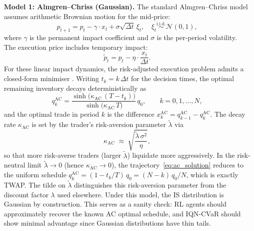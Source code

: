 \documentclass[11pt]{article}
\begin{document}
\textbf{Model 1: Almgren--Chriss (Gaussian).}  The standard Almgren--Chriss model \citet{almgren2001optimal} assumes arithmetic Brownian motion for the mid-price:
\begin{equation}\label{eq:ac_price}
    p_{t+1} = p_t - \gamma \cdot x_t + \sigma \sqrt{\Delta t}\, \xi_t, \quad \xi_t \overset{\text{i.i.d.}}{\sim} \mathcal{N}(0, 1),
\end{equation}
where $\gamma$ is the permanent impact coefficient and $\sigma$ is the per-period volatility.  The execution price includes temporary impact:
\begin{equation}\label{eq:ac_exec}
    \tilde{p}_t = p_t - \eta \cdot \frac{x_t}{\Delta t}.
\end{equation}
For these linear impact dynamics, the risk-adjusted execution problem admits a closed-form minimiser \citet{almgren2001optimal}. Writing $t_k = k\,\Delta t$ for the decision times, the optimal remaining inventory decays deterministically as
\begin{equation}\label{eq:ac_solution}
    q_k^{\mathrm{AC}} = \frac{\sinh\!\big(\kappa_{\mathrm{AC}}\,(T - t_k)\big)}{\sinh\!\big(\kappa_{\mathrm{AC}}\, T\big)}\, q_0, \qquad k = 0, 1, \ldots, N,
\end{equation}
and the optimal trade in period $k$ is the difference $x_k^{\mathrm{AC}} = q_{k-1}^{\mathrm{AC}} - q_k^{\mathrm{AC}}$. The decay rate $\kappa_{\mathrm{AC}}$ is set by the trader's risk-aversion parameter $\tilde{\lambda}$ via
\begin{equation}\label{eq:ac_kappa}
    \kappa_{\mathrm{AC}} \;\approx\; \sqrt{\frac{\tilde{\lambda}\,\sigma^2}{\eta}},
\end{equation}
so that more risk-averse traders (larger $\tilde{\lambda}$) liquidate more aggressively. In the risk-neutral limit $\tilde{\lambda} \to 0$ (hence $\kappa_{\mathrm{AC}} \to 0$), the trajectory~\eqref{eq:ac_solution} reduces to the uniform schedule $q_k^{\mathrm{AC}} = (1 - t_k/T)\,q_0 = (N-k)\,q_0/N$, which is exactly TWAP. The tilde on $\tilde{\lambda}$ distinguishes this risk-aversion parameter from the discount factor $\lambda$ used elsewhere.
Under this model, the IS distribution is Gaussian by construction.  This serves as a sanity check: RL agents should approximately recover the known AC optimal schedule, and IQN-CVaR should show minimal advantage since Gaussian distributions have thin tails.
\end{document}
